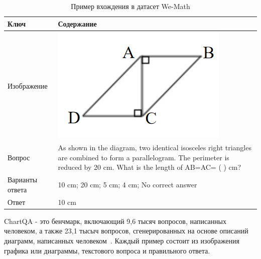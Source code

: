 \documentclass[LI,KR]{HSEUniversity}
\begin{document}
\begin{table}[H]
\centering
\begin{tabular}{| m{4cm} | m{12cm} |}
\hline
\textbf{Ключ} & \textbf{Содержание} \\ \hline
Изображение & \includegraphics[scale=0.35]{images/wemath_example} \\ \hline
Вопрос & As shown in the diagram, two identical isosceles right triangles are combined to form a parallelogram. The perimeter is reduced by 20 cm. What is the length of AB=AC= ( ) cm? \\ \hline
Варианты ответа & 10 cm; 20 cm; 5 cm; 4 cm; No correct answer \\ \hline
Ответ & 10 cm \\ \hline
\end{tabular}
\caption{Пример вхождения в датасет We-Math}
\end{table}

ChartQA - это бенчмарк, включающий 9,6 тысяч вопросов, написанных человеком,
а также 23,1 тысыч вопросов, сгенерированных на основе описаний диаграмм, написанных человеком~\cite{chartqa}.
Каждый пример состоит из изображения графика или диаграммы, текстового вопроса и правильного ответа.
\end{document}
